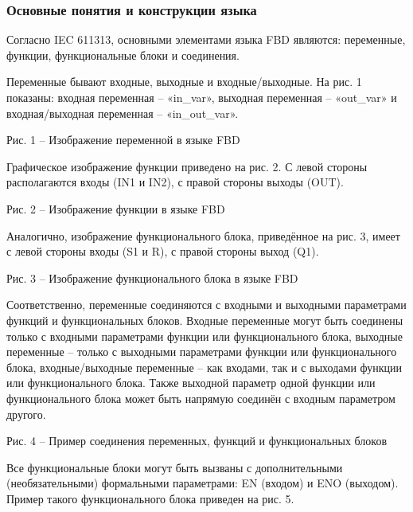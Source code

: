 \documentclass[letterpaper,10pt,russian]{sphinxmanual}
\begin{document}
\subsubsection{Основные понятия и конструкции языка}
\label{iec_guide/fbd_guide:id2}
Согласно IEC 61131­3, основными элементами языка FBD являются:
переменные, функции, функциональные блоки и соединения.

Переменные бывают входные, выходные и входные/выходные. На рис. 1
показаны: входная переменная – «in\_var», выходная переменная –
«out\_var» и входная/выходная переменная – «in\_out\_var».


Рис. 1 – Изображение переменной в языке FBD

Графическое изображение функции приведено на рис. 2. С левой стороны
располагаются вхо­ды (IN1 и IN2), с правой стороны выходы (OUT).


Рис. 2 – Изображение функции в языке FBD

Аналогично, изображение функционального блока, приведённое на рис. 3,
имеет с левой стороны вхо­ды (S1 и R), с правой стороны выход (Q1).


Рис. 3 – Изображение функционального блока в языке FBD

Соответственно, переменные соединяются с входными и выходными
параметрами функций и функциональных блоков. Входные переменные могут
быть соединены только с входными параметрами функции или функционального
блока, выходные переменные – только с выходными параметрами функции или
функционального блока, входные/выходные переменные – как входами, так и
с выходами функции или функционального блока. Также выходной параметр
одной функции или функционального блока может быть напрямую соединён с
входным параметром другого.


Рис. 4 – Пример соединения переменных, функций и функциональных блоков

Все функциональные блоки могут быть вызваны с дополнительными
(необязатель­ными) формальными параметрами: EN (входом) и ENO (выходом).
Пример такого функционального блока приведен на рис. 5.
\end{document}
